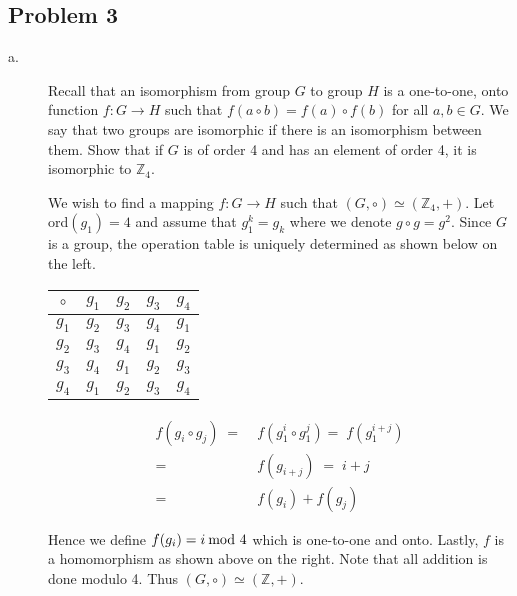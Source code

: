 \documentclass[../hw_sols.tex]{subfiles}
\begin{document}
\subsection*{Problem 3}

\begin{description}

\item[a.] Recall that an isomorphism from group $G$ to group $H$ is a 
one-to-one, onto function $f : G \to H$ such that 
$f(a \circ b) = f(a) \circ f(b)$ for all $a, b \in G$. We say that two groups 
are isomorphic if there is an isomorphism between them. Show that if $G$ is of 
order 4 and has an element of order 4, it is isomorphic to $\mathbb{Z}_4$.

\begin{solution}

We wish to find a mapping $f: G \to H$ such that 
$(G, \circ) \simeq (\mathbb{Z}_4,+)$. Let ord$(g_1) = 4$ and assume that 
$g_1^k = g_k$ where we denote $g \circ g = g^2$. Since $G$ is a group, the 
operation table is uniquely determined as shown below on the left.

\begin{multicols}{2}
	\begin{center}
	\begin{tabular}{ c | c | c | c | c }
		$\circ$ & $g_1$ & $g_2$ & $g_3$ & $g_4$ \\
		\hline
		  $g_1$ & $g_2$ & $g_3$ & $g_4$ & $g_1$ \\
		\hline
		  $g_2$ & $g_3$ & $g_4$ & $g_1$ & $g_2$ \\
		\hline
		  $g_3$ & $g_4$ & $g_1$ & $g_2$ & $g_3$ \\
		\hline
		  $g_4$ & $g_1$ & $g_2$ & $g_3$ & $g_4$ \\
	\end{tabular}
	\end{center}

\noindent
\begin{align*}
	f(g_i \circ g_j) \; 
	=& \; f(g_1^i \circ g_1^j) = \; f(g_1^{i+j}) \\
	=& \; f(g_{i+j}) \; = \; i + j \\
	=& \; f(g_i) + f(g_j)
\end{align*}
\end{multicols}

Hence we define $f(g_i) = i \tmod{4}$ which is one-to-one and onto. Lastly, 
$f$ is a homomorphism as shown above on the right. Note that all addition is 
done modulo 4. Thus $(G, \circ) \simeq (\mathbb{Z},+)$.


\end{solution}
\end{description}
\end{document}
